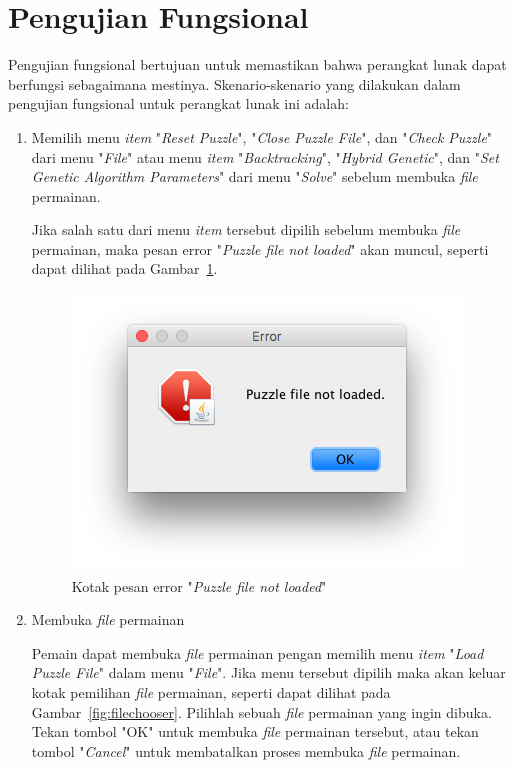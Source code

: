 \clearpage

\section{Pengujian Fungsional}
\label{sec:pengujianfungsional}

Pengujian fungsional bertujuan untuk memastikan bahwa perangkat lunak dapat berfungsi sebagaimana mestinya. Skenario-skenario yang dilakukan dalam pengujian fungsional untuk perangkat lunak ini adalah:

\begin{enumerate}
\item Memilih menu \textit{item} "\textit{Reset Puzzle}", "\textit{Close Puzzle File}", dan "\textit{Check Puzzle}" dari menu "\textit{File}" atau menu \textit{item} "\textit{Backtracking}", "\textit{Hybrid Genetic}", dan "\textit{Set Genetic Algorithm Parameters}" dari menu "\textit{Solve}" sebelum membuka \textit{file} permainan.

Jika salah satu dari menu \textit{item} tersebut dipilih sebelum membuka \textit{file} permainan, maka pesan error "\textit{Puzzle file not loaded}" akan muncul, seperti dapat dilihat pada Gambar~\ref{fig:puzzlefilenotloaded}.

\begin{figure}
\centering
\captionsetup{justification=centering}
\includegraphics[scale=0.5]{Gambar/ImplementasiPengujian/PuzzleFileNotLoaded.png}
\caption[Kotak pesan error "\textit{Puzzle file not loaded}"]{Kotak pesan error "\textit{Puzzle file not loaded}"}
\label{fig:puzzlefilenotloaded}
\end{figure}

\item Membuka \textit{file} permainan

Pemain dapat membuka \textit{file} permainan pengan memilih menu \textit{item} "\textit{Load Puzzle File}" dalam menu "\textit{File}". Jika menu tersebut dipilih maka akan keluar kotak pemilihan \textit{file} permainan, seperti dapat dilihat pada Gambar~\ref{fig:filechooser}. Pilihlah sebuah \textit{file} permainan yang ingin dibuka. Tekan tombol "OK" untuk membuka \textit{file} permainan tersebut, atau tekan tombol "\textit{Cancel}" untuk membatalkan proses membuka \textit{file} permainan.


\end{enumerate}
